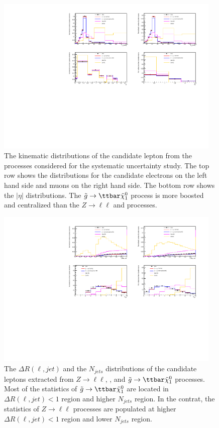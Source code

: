 \begin{figure}[htbp]
\includegraphics[width=0.96\textwidth]{baseline_kinematics.pdf}
\caption{The kinematic distributions of the candidate lepton from the processes considered for the systematic uncertainty study.
The top row shows the \pt distributions for the candidate electrons on the left hand side and muons on the right hand side.
The bottom row shows the $|\eta|$ distributions.
The $\tilde{g}\to\ttbar\tilde{\chi}^{0}_{1}$ process is more boosted and centralized than the $Z\to\ell\ell$ and \ttbar processes.
}
\label{fig:RLE_kinematic}
\end{figure}

\begin{figure}[htbp]
\includegraphics[width=0.96\textwidth]{baseline_deltaR_and_NJets.pdf}
\caption{The $\Delta R(\ell, jet)$ and the $N_{jets}$ distributions of the candidate leptons extracted from $Z\to\ell\ell$, \ttbar, and $\tilde{g}\to\ttbar\tilde{\chi}^{0}_{1}$ processes.
Most of the statistics of $\tilde{g}\to\ttbar\tilde{\chi}^{0}_{1}$ are located in $\Delta R(\ell, jet)<1$ region and higher $N_{jets}$ region.
In the contrat, the statistics of $Z\to\ell\ell$ processes are populated at higher $\Delta R(\ell, jet)<1$ region and lower $N_{jets}$ region.
}
\label{fig:RLE_dRjet_Njet}
\end{figure}

